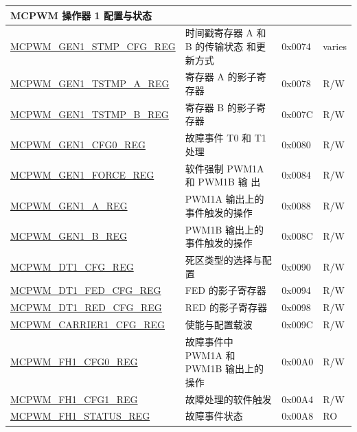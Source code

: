 \begin{longtable}{ | p{6cm} | p{7.2cm} | p{1.2cm} | p{1cm} | }
\multicolumn{3}{|l|}{\textbf{MCPWM 操作器 1 配置与状态}} \\ \hline
\hyperref[regdesc:MCPWMGEN1STMPCFGREG]{MCPWM\_GEN1\_STMP\_CFG\_REG} & 时间戳寄存器 A 和 B 的传输状态 和更新方式 & 0x0074 & varies\\ \hline
\hyperref[regdesc:MCPWMGEN1TSTMPAREG]{MCPWM\_GEN1\_TSTMP\_A\_REG} & 寄存器 A 的影子寄存器 & 0x0078 &  R/W \\ \hline
\hyperref[regdesc:MCPWMGEN1TSTMPBREG]{MCPWM\_GEN1\_TSTMP\_B\_REG} & 寄存器 B 的影子寄存器 & 0x007C & R/W \\ \hline
\hyperref[regdesc:MCPWMGEN1CFG0REG]{MCPWM\_GEN1\_CFG0\_REG} & 故障事件 T0 和 T1 处理 &  0x0080 &  R/W \\ \hline
\hyperref[regdesc:MCPWMGEN1FORCEREG]{MCPWM\_GEN1\_FORCE\_REG} & 软件强制 PWM1A 和 PWM1B 输 出 &  0x0084 & R/W \\ \hline
\hyperref[regdesc:MCPWMGEN1AREG]{MCPWM\_GEN1\_A\_REG} & PWM1A 输出上的事件触发的操作 & 0x0088 &  R/W \\ \hline
\hyperref[regdesc:MCPWMGEN1BREG]{MCPWM\_GEN1\_B\_REG} & PWM1B 输出上的事件触发的操作 & 0x008C & R/W \\ \hline
\hyperref[regdesc:MCPWMDT1CFGREG]{MCPWM\_DT1\_CFG\_REG} & 死区类型的选择与配置  & 0x0090  & R/W \\ \hline
\hyperref[regdesc:MCPWMDT1FEDCFGREG]{MCPWM\_DT1\_FED\_CFG\_REG} & FED 的影子寄存器 & 0x0094 & R/W \\ \hline
\hyperref[regdesc:MCPWMDT1REDCFGREG]{MCPWM\_DT1\_RED\_CFG\_REG} & RED 的影子寄存器 & 0x0098 & R/W \\ \hline
\hyperref[regdesc:MCPWMCARRIER1CFGREG]{MCPWM\_CARRIER1\_CFG\_REG} & 使能与配置载波 & 0x009C & R/W \\ \hline
\hyperref[regdesc:MCPWMFH1CFG0REG]{MCPWM\_FH1\_CFG0\_REG} & 故障事件中 PWM1A 和 PWM1B 输出上的操作 & 0x00A0 & R/W \\ \hline
\hyperref[regdesc:MCPWMFH1CFG1REG]{MCPWM\_FH1\_CFG1\_REG} & 故障处理的软件触发 & 0x00A4 &  R/W \\ \hline
\hyperref[regdesc:MCPWMFH1STATUSREG]{MCPWM\_FH1\_STATUS\_REG} & 故障事件状态 &0x00A8 & RO \\ \hline


\end{longtable}
